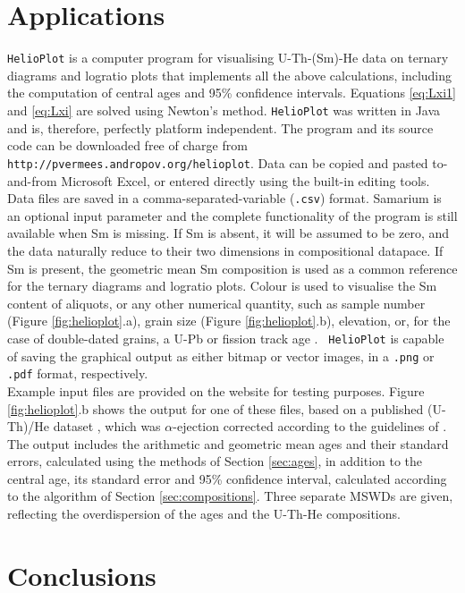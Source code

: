 \documentclass{article}
\begin{document}
\section{Applications} \label{sec:helioplot}

{\tt HelioPlot} is a computer program for visualising U-Th-(Sm)-He
data on ternary diagrams and logratio plots that implements all the
above calculations, including the computation of central ages and 95\%
confidence intervals.  Equations \ref{eq:Lxi1} and \ref{eq:Lxi} are
solved using Newton's method.  {\tt HelioPlot} was written in Java and
is, therefore, perfectly platform independent.  The program and its
source code can be downloaded free of charge from {\tt
  http://pvermees.andro\-pov.org/helio\-plot}.  Data can be copied
and pasted to-and-from Microsoft Excel, or entered directly using the
built-in editing tools.  Data files are saved in a
comma-separated-variable ({\tt .csv}) format. Samarium is an optional
input parameter and the complete functionality of the program is still
available when Sm is missing. If Sm is absent, it will be assumed to
be zero, and the data naturally reduce to their two dimensions in
compositional datapace.  If Sm is present, the geometric mean Sm
composition is used as a common reference for the ternary diagrams and
logratio plots.  Colour is used to visualise the Sm content of
aliquots, or any other numerical quantity, such as sample number
(Figure \ref{fig:helioplot}.a), grain size (Figure
\ref{fig:helioplot}.b), elevation, or, for the case of double-dated
grains, a U-Pb or fission track age \citep{campbell2005}.  {\tt
  HelioPlot} is capable of saving the graphical output as either
bitmap or vector images, in a {\tt .png} or {\tt .pdf} format,
respectively.
\\

Example input files are provided on the website for testing purposes.
Figure \ref{fig:helioplot}.b shows the output for one of these files,
based on a published (U-Th)/He dataset \citep{vermeesch2007b}, which
was $\alpha$-ejection corrected according to the guidelines of
\citet{ketcham2009}. The output includes the arithmetic and geometric
mean ages and their standard errors, calculated using the methods of
Section \ref{sec:ages}, in addition to the central age, its standard
error and 95\% confidence interval, calculated according to the
algorithm of Section \ref{sec:compositions}.  Three separate MSWDs are
given, reflecting the overdispersion of the ages and the U-Th-He
compositions.

\section{Conclusions}
\end{document}
